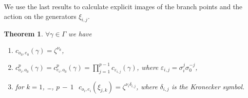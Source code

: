 \documentclass[]{amsart}
\numberwithin{equation}{section}
\newtheorem{theorem}{Theorem}[section]
\begin{document}
We use the last results to calculate explicit images of the branch points and 
the action on the generators $\xi_{i,j}$.
\begin{theorem}\label{branchpointimages}
 $\forall \gamma\in \Gamma$ we have
\begin{enumerate}
\item $c_{o_0,e_0}(\gamma)=\zeta^{\nu_0}$,  \label{image1}
\item $c_{o_i,o_0}^p (\gamma) = c_{e_i,o_0}^p (\gamma)
=\prod_{j=1}^{p-1} c_{\varepsilon_{i,j}} (\gamma)$, where $\varepsilon_{i,j}=\sigma_i^j \sigma_0^{-j}$, \label{image2}
\item for $k=1$, \ldots, $p\,{-}\,1\ $\ $c_{o_i,e_i}(\xi_{j,k})=\zeta^{\nu_i\delta_{i,j}}$, where  $\delta_{i,j}$ is the Kronecker symbol. \label{image3}
\end{enumerate}
\end{theorem}
\end{document}
